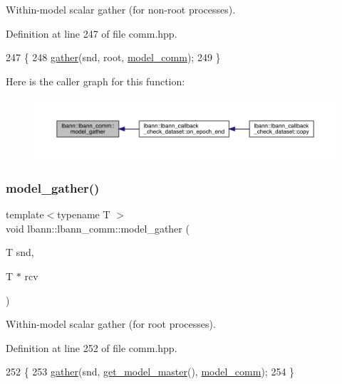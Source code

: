 Within-\/model scalar gather (for non-\/root processes). 

Definition at line 247 of file comm.\+hpp.


\begin{DoxyCode}
247                                      \{
248     \hyperlink{classlbann_1_1lbann__comm_aa784298e6ed0f9f01a20b179d5110df9}{gather}(snd, root, \hyperlink{classlbann_1_1lbann__comm_a58a75b76bd61ec8a26c1cbbec3dc2f45}{model\_comm});
249   \}
\end{DoxyCode}
Here is the caller graph for this function\+:\nopagebreak
\begin{figure}[H]
\begin{center}
\leavevmode
\includegraphics[width=350pt]{classlbann_1_1lbann__comm_ab7cdeca37f1fcd22a3b69f6134fb299f_icgraph}
\end{center}
\end{figure}
\mbox{\label{classlbann_1_1lbann__comm_a54ee25dd95d57c0781ac0aa84d30ab8b}} 
\subsubsection{\texorpdfstring{model\+\_\+gather()}{model\_gather()}\hspace{0.1cm}{\footnotesize\ttfamily [2/4]}}
{\footnotesize\ttfamily template$<$typename T $>$ \\
void lbann\+::lbann\+\_\+comm\+::model\+\_\+gather (\begin{DoxyParamCaption}\item[{T}]{snd,  }\item[{T $\ast$}]{rcv }\end{DoxyParamCaption})\hspace{0.3cm}{\ttfamily [inline]}}

Within-\/model scalar gather (for root processes). 

Definition at line 252 of file comm.\+hpp.


\begin{DoxyCode}
252                                    \{
253     \hyperlink{classlbann_1_1lbann__comm_aa784298e6ed0f9f01a20b179d5110df9}{gather}(snd, \hyperlink{classlbann_1_1lbann__comm_a96d8d7a0ff8ee1511f8c8b8fa92628af}{get\_model\_master}(), \hyperlink{classlbann_1_1lbann__comm_a58a75b76bd61ec8a26c1cbbec3dc2f45}{model\_comm});
254   \}
\end{DoxyCode}
\mbox{\label{classlbann_1_1lbann__comm_ab3d868497325882372e1a8d9f878cd2f}} 
